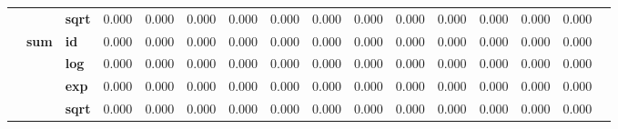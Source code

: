 \begin{table}[ht!]
{\begin{tabular}{cclccccccccccccc}
                & & \textbf{sqrt} & 0.000 & 0.000 & 0.000 & 0.000 & 0.000 & 0.000 & 0.000 & 0.000 & 0.000 & 0.000 & 0.000 & 0.000 \\
        \cmidrule{2-15}
        & \multirow{4}{*}{\textbf{sum}}
                  & \textbf{id}   & 0.000 & 0.000 & 0.000 & 0.000 & 0.000 & 0.000 & 0.000 & 0.000 & 0.000 & 0.000 & 0.000 & 0.000 \\
                & & \textbf{log}  & 0.000 & 0.000 & 0.000 & 0.000 & 0.000 & 0.000 & 0.000 & 0.000 & 0.000 & 0.000 & 0.000 & 0.000 \\
                & & \textbf{exp}  & 0.000 & 0.000 & 0.000 & 0.000 & 0.000 & 0.000 & 0.000 & 0.000 & 0.000 & 0.000 & 0.000 & 0.000 \\
                & & \textbf{sqrt} & 0.000 & 0.000 & 0.000 & 0.000 & 0.000 & 0.000 & 0.000 & 0.000 & 0.000 & 0.000 & 0.000 & 0.000 \\
        \midrule


\end{tabular}}
\end{table}
